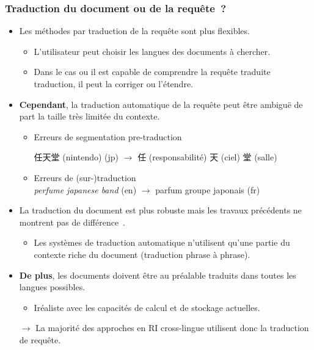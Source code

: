 \documentclass[12pt,aspectratio=43,dvipsnames,table]{beamer}
\begin{document}
\begin{frame}[allowframebreaks]
    \frametitle{Traduction du document ou de la requête~?}
    \begin{itemize} \itemsep10pt
        \item Les méthodes par traduction de la requête sont plus flexibles.
        \begin{itemize}
            \item L'utilisateur peut choisir les langues des documents à
                  chercher.
            \item Dans le cas ou il est capable de comprendre la requête 
                  traduite traduction, il peut la corriger ou l'étendre.
        \end{itemize}
        \item \textbf{Cependant}, la traduction automatique de la requête peut 
              être ambiguë de part la taille très limitée du contexte.
        \begin{itemize}
            \item Erreurs de segmentation pre-traduction \\
                  \begin{CJK}{UTF8}{min}
                  任天堂 (nintendo) (jp) $\to$  任 (responsabilité) 天 (ciel) 
                  堂 (salle)
                  \end{CJK}
            \item Erreurs de (sur-)traduction \\
                  \textit{perfume japanese band} (en) $\to$ parfum groupe 
                  japonais (fr)        
        \end{itemize}

        \framebreak

        \item La traduction du document est plus robuste mais les travaux 
              précédents ne montrent pas de différence~\cite{McCarley:1999}.
        \begin{itemize}
            \item Les systèmes de traduction automatique n'utilisent qu'une 
                  partie du contexte riche du document (traduction phrase à 
                  phrase).
        \end{itemize}
        \item \textbf{De plus}, les documents doivent être au préalable traduits
              dans toutes les langues possibles.
        \begin{itemize}
            \item Iréaliste avec les capacités de calcul et de stockage 
                  actuelles.
        \end{itemize}
        \item[$\to$] La majorité des approches en RI cross-lingue utilisent donc
                     la traduction de requête.
    \end{itemize}
\end{frame}
\end{document}
